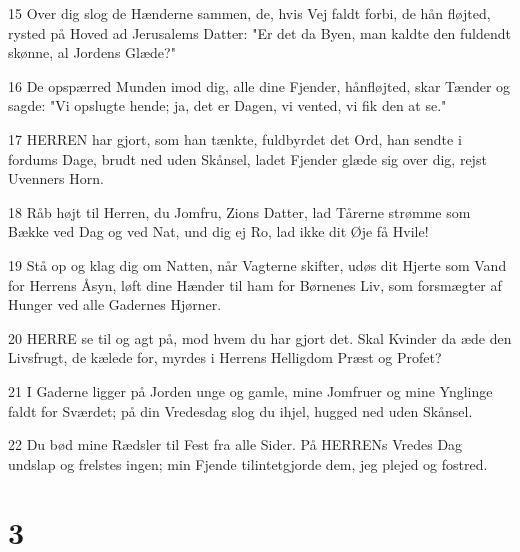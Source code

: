 \par 15 Over dig slog de Hænderne sammen, de, hvis Vej faldt forbi, de hån fløjted, rysted på Hoved ad Jerusalems Datter: "Er det da Byen, man kaldte den fuldendt skønne, al Jordens Glæde?"
\par 16 De opspærred Munden imod dig, alle dine Fjender, hånfløjted, skar Tænder og sagde: "Vi opslugte hende; ja, det er Dagen, vi vented, vi fik den at se."
\par 17 HERREN har gjort, som han tænkte, fuldbyrdet det Ord, han sendte i fordums Dage, brudt ned uden Skånsel, ladet Fjender glæde sig over dig, rejst Uvenners Horn.
\par 18 Råb højt til Herren, du Jomfru, Zions Datter, lad Tårerne strømme som Bække ved Dag og ved Nat, und dig ej Ro, lad ikke dit Øje få Hvile!
\par 19 Stå op og klag dig om Natten, når Vagterne skifter, udøs dit Hjerte som Vand for Herrens Åsyn, løft dine Hænder til ham for Børnenes Liv, som forsmægter af Hunger ved alle Gadernes Hjørner.
\par 20 HERRE se til og agt på, mod hvem du har gjort det. Skal Kvinder da æde den Livsfrugt, de kælede for, myrdes i Herrens Helligdom Præst og Profet?
\par 21 I Gaderne ligger på Jorden unge og gamle, mine Jomfruer og mine Ynglinge faldt for Sværdet; på din Vredesdag slog du ihjel, hugged ned uden Skånsel.
\par 22 Du bød mine Rædsler til Fest fra alle Sider. På HERRENs Vredes Dag undslap og frelstes ingen; min Fjende tilintetgjorde dem, jeg plejed og fostred.

\chapter{3}

